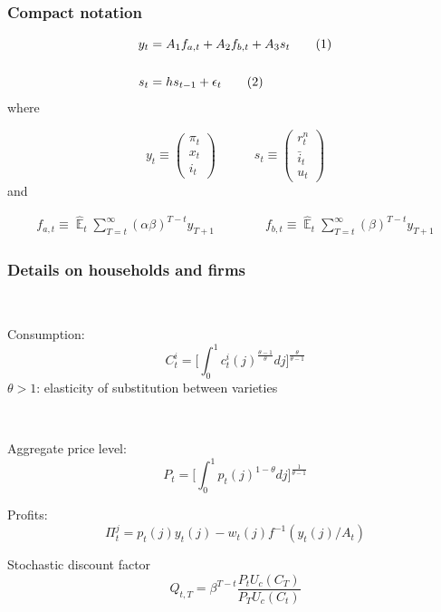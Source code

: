\documentclass{beamer}
\DeclareMathOperator{\E}{\mathbb{E}}
\newcommand\numberthis{\addtocounter{equation}{1}\tag{\theequation}} %
\begin{document}
\begin{frame}
	\frametitle{Compact notation}
	\label{compact}

 \begin{align*}
y_t & = A_1 f_{a,t} + A_2 f_{b,t} + A_3 s_t \label{LOM_LR} \numberthis \\
\\
s_t & = h s_{t-1} + \epsilon_t \label{exog} \numberthis
\end{align*}
where

\begin{equation}
 y_t \equiv \begin{pmatrix} \pi_t \\ x_t \\ i_t
 \end{pmatrix} 
 \quad \quad \quad 
  s_t  \equiv \begin{pmatrix} r_t^n \\ \bar{i}_t \\ u_t 
 \end{pmatrix} 
\end{equation}
and

  \begin{align}
f_{a,t}  \equiv  \hat{\E}_t\sum_{T=t}^{\infty} (\alpha\beta)^{T-t } y_{T+1} \quad \quad \quad \quad 
f_{b,t}  \equiv \hat{\E}_t\sum_{T=t}^{\infty} (\beta)^{T-t } y_{T+1} \label{fafb}
\end{align}

\hyperlink{aggregate_LOMS}{}	


\end{frame}
\begin{frame}
	\frametitle{Details on households and firms}
	\label{details_HHs_firms}

\

Consumption:	
\begin{equation}
C^i_t =  \bigg[  \int_0^1 c^i_t(j)^{\frac{\theta-1}{\theta}} dj \bigg]^{\frac{\theta}{\theta-1}}\label{dixit}
\end{equation}
$\theta>1$: elasticity of substitution between varieties

\

Aggregate price level:
\begin{equation}
P_t =  \bigg[  \int_0^1 p_t(j)^{1-\theta} dj \bigg]^{\frac{1}{\theta-1}}
\label{agg_price}
\end{equation}

Profits:
\begin{equation}
\Pi_t^j = p_t(j)y_t(j) -w_t(j)f^{-1}(y_t(j)/A_t)
\end{equation}

Stochastic discount factor
\begin{equation}
Q_{t,T} = \beta^{T-t} \frac{P_t U_c(C_T)}{P_T U_c(C_t)}
\end{equation}


\hyperlink{HH}{}	


\end{frame}
\end{document}

